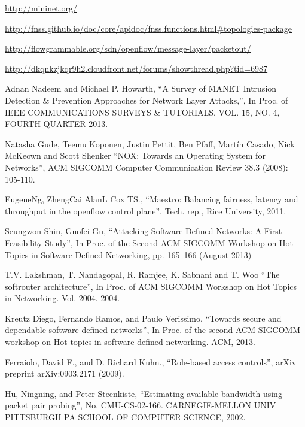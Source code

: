 \begin{thebibliography}{1}
\url{http://mininet.org/}

\url{http://fnss.github.io/doc/core/apidoc/fnss.functions.html#topologies-package}

\url{http://flowgrammable.org/sdn/openflow/message-layer/packetout/}

\url{http://dkqnkzjkqr9h2.cloudfront.net/forums/showthread.php?tid=6987}










Adnan Nadeem and Michael P. Howarth,
``A Survey of MANET Intrusion Detection \& Prevention Approaches for Network Layer Attacks,'', In Proc. of IEEE COMMUNICATIONS SURVEYS \& TUTORIALS, VOL. 15, NO. 4, FOURTH QUARTER 2013.

Natasha Gude, Teemu Koponen, Justin Pettit, Ben Pfaff, Martín Casado, Nick McKeown and Scott Shenker
``NOX: Towards an Operating System for Networks'', ACM SIGCOMM Computer Communication Review 38.3 (2008): 105-110.

EugeneNg, ZhengCai AlanL Cox TS.,
``Maestro: Balancing fairness, latency and throughput in the openflow control plane'', Tech. rep., Rice University, 2011.

Seungwon Shin, Guofei Gu, 
``Attacking Software-Defined Networks: A First Feasibility Study'', In Proc. of the Second ACM SIGCOMM Workshop on Hot Topics in Software Defined Networking, pp. 165–166 (August 2013)

T.V. Lakshman, T. Nandagopal, R. Ramjee, K. Sabnani and T. Woo
``The softrouter architecture'', In Proc. of ACM SIGCOMM Workshop on Hot Topics in Networking. Vol. 2004. 2004.

Kreutz Diego, Fernando Ramos, and Paulo Verissimo, 
``Towards secure and dependable software-defined networks'', In Proc. of the second ACM SIGCOMM workshop on Hot topics in software defined networking. ACM, 2013.


Ferraiolo, David F., and D. Richard Kuhn., 
``Role-based access controls'', arXiv preprint arXiv:0903.2171 (2009).

\bibitem{}
Hu, Ningning, and Peter Steenkiste,
``Estimating available bandwidth using packet pair probing'', No. CMU-CS-02-166. CARNEGIE-MELLON UNIV PITTSBURGH PA SCHOOL OF COMPUTER SCIENCE, 2002.


\end{thebibliography}
